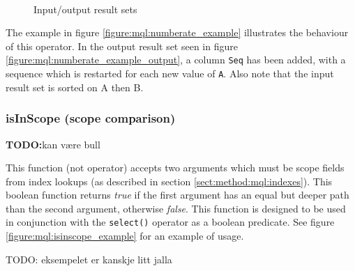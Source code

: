 \begin{figure}[!h]
\centering
\mbox{
\quad
{}
}
\caption{Input/output result sets}
\end{figure}
The example in figure \ref{figure:mql:numberate_example} illustrates the
behaviour of this operator. In the output result set seen in figure
\ref{figure:mql:numberate_example_output}, a column \texttt{Seq} has been
added, with a sequence which is restarted for each new value of \texttt{A}.
Also note that the input result set is sorted on A then B.

\subsubsection{isInScope (scope comparison)}
\textbf{\LARGE TODO:}kan v\ae re bull

This function (not operator) accepts two arguments which must be scope fields
from index lookups (as described in section \ref{sect:method:mql:indexes}).
This boolean function returns \textit{true} if the first argument has an equal
but deeper path than the second argument, otherwise \textit{false}. This
function is designed to be used in conjunction with the \texttt{select()}
operator as a boolean predicate. See figure \ref{figure:mql:isinscope_example}
for an example of usage.

TODO: eksempelet er kanskje litt jalla

